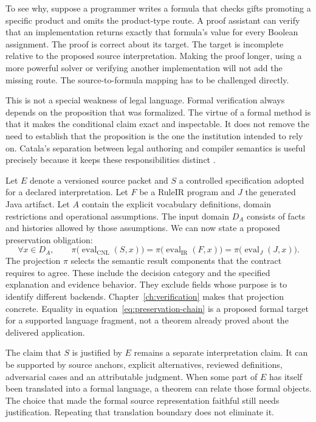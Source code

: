 \documentclass[12pt,a4paper,oneside,openany]{book}
\newcommand{\IR}{\mathrm{IR}}
\newcommand{\CNL}{\mathrm{CNL}}
\newcommand{\eval}{\operatorname{eval}}
\begin{document}
To see why, suppose a programmer writes a formula that checks gifts promoting a
specific product and omits the product-type route. A proof assistant can verify
that an implementation returns exactly that formula's value for every Boolean
assignment. The proof is correct about its target. The target is incomplete
relative to the proposed source interpretation. Making the proof longer, using a
more powerful solver or verifying another implementation will not add the
missing route. The source-to-formula mapping has to be challenged directly.

This is not a special weakness of legal language. Formal verification always
depends on the proposition that was formalized. The virtue of a formal method
is that it makes the conditional claim exact and inspectable. It does not remove
the need to establish that the proposition is the one the institution intended
to rely on. Catala's separation between legal authoring and compiler semantics
is useful precisely because it keeps these responsibilities distinct
\citep[core language and compilation sections]{catala2021}.

Let $E$ denote a versioned source packet and $S$ a controlled specification
adopted for a declared interpretation. Let $F$ be a RuleIR program and $J$ the
generated Java artifact. Let $A$ contain the explicit vocabulary definitions,
domain restrictions and operational assumptions. The input domain $D_A$ consists
of facts and histories allowed by those assumptions. We can now state a proposed
preservation obligation:
\begin{equation}
 \forall x\in D_A,\qquad
 \pi\bigl(\eval_{\CNL}(S,x)\bigr)
 =\pi\bigl(\eval_{\IR}(F,x)\bigr)
 =\pi\bigl(\eval_{J}(J,x)\bigr).
 \label{eq:preservation-chain}
\end{equation}
The projection $\pi$ selects the semantic result components that the contract
requires to agree. These include the decision category and the specified
explanation and evidence behavior. They exclude fields whose purpose is to
identify different backends. Chapter~\ref{ch:verification} makes that projection
concrete. Equality in equation~\eqref{eq:preservation-chain} is a proposed formal
target for a supported language fragment, not a theorem already proved about
the delivered application.

The claim that $S$ is justified by $E$ remains a separate interpretation claim.
It can be supported by source anchors, explicit alternatives, reviewed
definitions, adversarial cases and an attributable judgment. When some part of
$E$ has itself been translated into a formal language, a theorem can relate
those formal objects. The choice that made the formal source representation
faithful still needs justification. Repeating that translation boundary does not
eliminate it.
\end{document}
